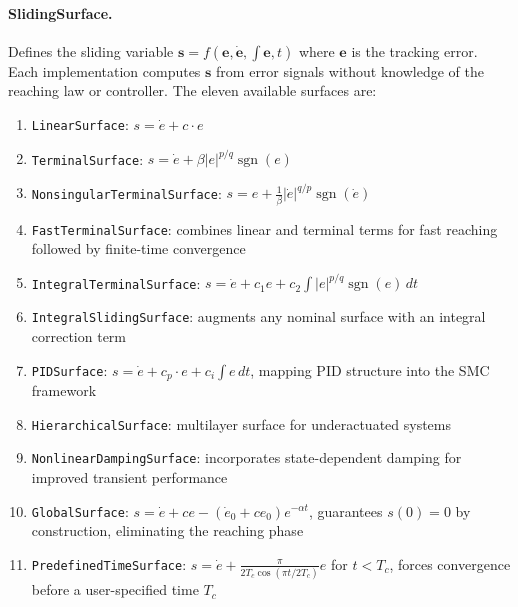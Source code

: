 \documentclass[preprint,12pt]{elsarticle}
\begin{document}
\paragraph{SlidingSurface.} Defines the sliding variable $\mathbf{s} = f(\mathbf{e}, \dot{\mathbf{e}}, \int\mathbf{e}, t)$ where $\mathbf{e}$ is the tracking error. Each implementation computes $\mathbf{s}$ from error signals without knowledge of the reaching law or controller. The eleven available surfaces are:
\begin{enumerate}
    \item \texttt{LinearSurface}: $s = \dot{e} + c \cdot e$~\cite{utkin1977variable}
    \item \texttt{TerminalSurface}: $s = \dot{e} + \beta |e|^{p/q} \operatorname{sgn}(e)$~\cite{yu2009terminal}
    \item \texttt{NonsingularTerminalSurface}: $s = e + \frac{1}{\beta} |\dot{e}|^{q/p} \operatorname{sgn}(\dot{e})$~\cite{feng2014non}
    \item \texttt{FastTerminalSurface}: combines linear and terminal terms for fast reaching followed by finite-time convergence
    \item \texttt{IntegralTerminalSurface}: $s = \dot{e} + c_1 e + c_2 \int |e|^{p/q} \operatorname{sgn}(e)\,dt$
    \item \texttt{IntegralSlidingSurface}: augments any nominal surface with an integral correction term
    \item \texttt{PIDSurface}: $s = \dot{e} + c_p \cdot e + c_i \int e\,dt$, mapping PID structure into the SMC framework
    \item \texttt{HierarchicalSurface}: multilayer surface for underactuated systems~\cite{qian2015hierarchical}
    \item \texttt{NonlinearDampingSurface}: incorporates state-dependent damping for improved transient performance~\cite{bandyopadhyay2009sliding}
    \item \texttt{GlobalSurface}: $s = \dot{e} + ce - (\dot{e}_0 + ce_0)e^{-\alpha t}$, guarantees $s(0) = 0$ by construction, eliminating the reaching phase~\cite{bartoszewicz1998discrete}
    \item \texttt{PredefinedTimeSurface}: $s = \dot{e} + \frac{\pi}{2T_c \cos(\pi t / 2T_c)} e$ for $t < T_c$, forces convergence before a user-specified time $T_c$~\cite{sancheztorres2018predefined}
\end{enumerate}
\end{document}
